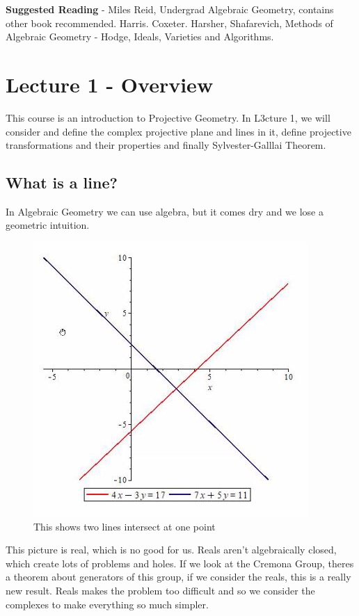 \documentclass{article}
\begin{document}
  \maketitle

\textbf{Suggested Reading} - Miles Reid, Undergrad Algebraic Geometry, contains other book recommended. Harris. Coxeter. Harsher, Shafarevich, Methods of Algebraic Geometry - Hodge, Ideals, Varieties and Algorithms.\\

\section{Lecture 1 - Overview}
This course is an introduction to Projective Geometry. In L3cture 1, we will consider and define the complex projective plane and lines in it, define projective transformations and their properties and finally Sylvester-Galllai Theorem.

\subsection{What is a line?}
In Algebraic Geometry we can use algebra, but it comes dry and we lose a geometric intuition.
\begin{figure}[!ht]
\centering
\includegraphics{./figures/L1.1}
\caption{This shows two lines intersect at one point}
\end{figure}

This picture is real, which is no good for us. Reals aren't algebraically closed, which create lots of problems and holes. If we look at the Cremona Group, theres a theorem about generators of this group, if we consider the reals, this is a really new result. Reals makes the problem too difficult and so we consider the complexes to make everything so much simpler.\\
\end{document}

